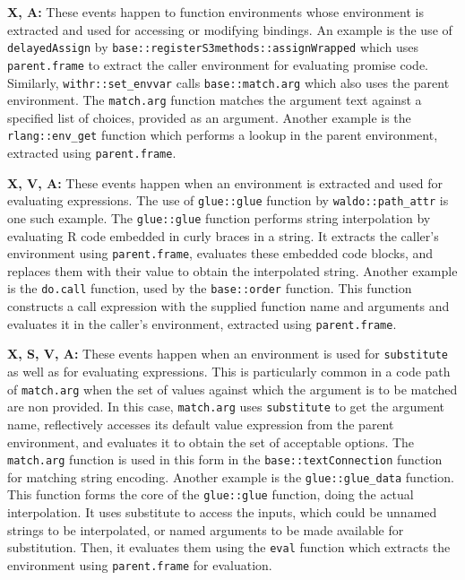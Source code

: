\documentclass[10pt,review,sigplan,authorversion=true]{acmart}
\newcommand{\code}[1]{\lstinline |#1|\xspace}
\newcommand{\substitute}{\code{substitute}}
\begin{document}
\noindent
\textbf{X, A:} These events happen to function environments whose
  environment is extracted and used for accessing or modifying bindings. An
  example is the use of \code{delayedAssign} by
  \code{base::registerS3methods::assignWrapped} which uses \code{parent.frame}
  to extract the caller environment for evaluating promise code. Similarly,
  \code{withr::set_envvar} calls \code{base::match.arg} which also uses the
  parent environment. The \code{match.arg} function matches the argument text
  against a specified list of choices, provided as an argument. Another example
  is the \code{rlang::env_get} function which performs a lookup in the parent
  environment, extracted using \code{parent.frame}.

\noindent
\textbf{X, V, A:} These events happen when an environment is extracted
  and used for evaluating expressions. The use of \code{glue::glue} function by
  \code{waldo::path_attr} is one such example. The \code{glue::glue} function
  performs string interpolation by evaluating R code embedded in curly braces in
  a string. It extracts the caller's environment using \code{parent.frame},
  evaluates these embedded code blocks, and replaces them with their value to
  obtain the interpolated string. Another example is the \code{do.call}
  function, used by the \code{base::order} function. This function constructs a
  call expression with the supplied function name and arguments and evaluates it
  in the caller's environment, extracted using \code{parent.frame}.

\noindent
\textbf{X, S, V, A:} These events happen when an environment is used for
  \substitute as well as for evaluating expressions. This is particularly common
  in a code path of \code{match.arg} when the set of values against which the
  argument is to be matched are non provided. In this case, \code{match.arg}
  uses \code{substitute} to get the argument name, reflectively accesses its
  default value expression from the parent environment, and evaluates it to
  obtain the set of acceptable options. The \code{match.arg} function is used in
  this form in the \code{base::textConnection} function for matching string
  encoding. Another example is the \code{glue::glue_data} function. This
  function forms the core of the \code{glue::glue} function, doing the actual
  interpolation. It uses substitute to access the inputs, which could be unnamed
  strings to be interpolated, or named arguments to be made available for
  substitution. Then, it evaluates them using the \code{eval} function which
  extracts the environment using \code{parent.frame} for evaluation.
\end{document}
